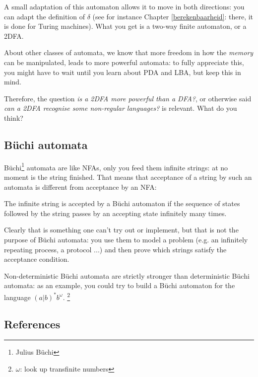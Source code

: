 A small adaptation of this automaton allows it to move in both
directions: you can adapt the definition of $\delta$ (see for instance
Chapter \ref{berekenbaarheid}: there, it is done for Turing
machines). What you get is a two-way finite automaton, or a 2DFA.

About other classes of automata, we know that more freedom in how the
{\em memory} can be manipulated, leads to more powerful automata: to
fully appreciate this, you might have to wait until you learn about
PDA and LBA, but keep this in mind.

Therefore, the question {\em is a 2DFA more powerful than a DFA?}, or
otherwise said {\em can a 2DFA recognise some non-regular languages?}
is relevant. What do you think?



\subsection{B\"{u}chi automata}

B\"{u}chi\footnote{Julius B\"{u}chi} automata are like NFAs, only you
feed them infinite strings: at no moment is the string finished.
That means that acceptance of a string by such an automata is
different from acceptance by an NFA:

\begin{definition}
The infinite string is accepted by a B\"{u}chi automaton if the
sequence of states followed by the string passes by an accepting state infinitely many times.
\end{definition}

Clearly that is something one can't try out or implement, but that is
not the purpose of B\"{u}chi automata: you use them to model a problem
(e.g. an infinitely repeating process, a protocol ...) and then prove
which strings satisfy the acceptance condition.

Non-deterministic B\"{u}chi automata are strictly stronger than
deterministic B\"{u}chi automata: as an example, you could try to
build a B\"{u}chi automaton for the language $(a|b)^*b^\omega$. \footnote{$\omega$: look up transfinite numbers}




\subsection{References}

